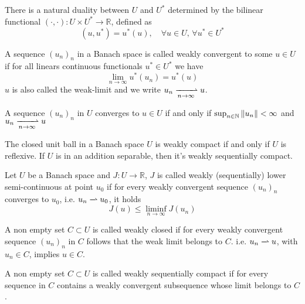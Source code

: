 \begin{remark}
	There is a natural duality between $U$ and $U^*$ determined by the bilinear functional $(\cdot, \cdot): U\times U^*\rightarrow \mathbb{R}$, defined as \[(u, u^*)=u^*(u), \quad \forall u \in U, \, \forall u^* \in U^*\]
\end{remark}

\begin{definition}
	A sequence $(u_n)_n$ in a Banach space is called weakly convergent to some $u\in U$ if for all linears continuous functionals $u^* \in U^*$ we have
	\[
		\lim_{n\rightarrow \infty}u^*(u_n)=u^*(u)
	\]
	$u$ is also called the weak-limit and we write $u_n \xrightharpoonup[n\rightarrow\infty]{} u$.
\end{definition}

\begin{theorem}
	A sequence $(u_n)_n$ in $U$ converges to $u\in U$ if and only if $\sup_{n\in \mathbb{N}} \left\lVert u_n\right\rVert < \infty $ and $u_n \xrightharpoonup[n\rightarrow \infty]{}u$
\end{theorem}
\begin{theorem}
	The closed unit ball in a Banach space $U$ is weakly compact if and only if $U$ is reflexive. If $U$ is in an addition separable, then it's weakly sequentially compact.
\end{theorem}

\begin{definition}
	Let $U$ be a Banach space and $J: U \rightarrow \mathbb{R}$, $J$ is called weakly (sequentially) lower semi-continuous at point $u_0$ if for every weakly convergent sequence $(u_n)_n$ converges to $u_0$, i.e. $u_n \xrightharpoonup[]{} u_0$, it holds \[J(u)\leq \liminf_{n\rightarrow \infty} J(u_n)\]
\end{definition}

\begin{definition}
	A non empty set $C\subset U$ is called weakly closed if for every weakly convergent sequence $(u_n)_n$ in $C$ follows that the weak limit belongs to $C$. i.e. $u_n \xrightharpoonup[]{} u$, with $u_n \in C$, implies $u\in C$.
\end{definition}

\begin{definition}
	A non empty set $C\subset U$ is called weakly sequentially compact if for every sequence in $C$ contains a weakly convergent subsequence whose limit belongs to $C$.
\end{definition}


